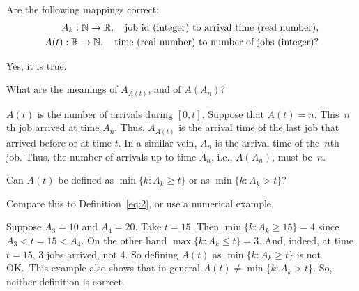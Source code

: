 \documentclass[queueing-book.tex]{subfiles}
\begin{document}
\begin{exercise}\label{ex:60}
Are the following mappings correct:
\begin{align*}
 A_k : \mathbb{N} \to \mathbb{R}, \quad{\text{job id (integer) to arrival time (real number)}}, \\
 A(t) : \mathbb{R}\to \mathbb{N}, \quad{\text{time (real number) to number of jobs (integer)}}?
\end{align*}
\begin{solution}
  Yes, it is true.
\end{solution}
\end{exercise}

\begin{exercise}\label{ex:61}
 What are the meanings of $A_{A(t)}$, and of $A(A_n)$?
\begin{solution}
 $A(t)$ is the number of arrivals during $[0,t]$. Suppose that
 $A(t) = n$. This~$n$th job arrived at time $A_n$. Thus, $A_{A(t)}$
 is the arrival time of the last job that arrived before or at time
 $t$. In a similar vein, $A_n$ is the arrival time of the~$n$th
 job. Thus, the number of arrivals up to time $A_n$, i.e., $A(A_n)$,
 must be~$n$.
\end{solution}
\end{exercise}

\begin{exercise}\label{ex:22}
Can $A(t)$ be defined as $\min\{k : A_k \geq t\}$ or as $\min\{k: A_k > t\}$?
\begin{hint}
Compare this to Definition~\cref{eq:2}, or use a numerical example.
\end{hint}
\begin{solution}
  Suppose $A_3 = 10$ and $A_4 = 20$.
  Take $t=15$.
  Then $\min\{k : A_k \geq 15\} = 4$ since $A_3 < t=15 < A_4$.
  On the other hand $\max\{k : A_k \leq t\} = 3$.
  And, indeed, at time $t=15$, 3 jobs arrived, not 4.
  So defining $A(t)$ as $\min\{k : A_k \geq t\}$ is not OK.\
  This example also shows that in general $A(t) \neq \min\{k : A_k > t\}$.
  So, neither definition is correct.
\end{solution}
\end{exercise}
\end{document}
